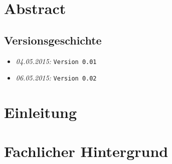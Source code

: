 \documentclass{fhnwreport/fhnwreport}
\begin{document}



\section*{Abstract}
\label{sec:abstract}



\clearpage




\tableofcontents

\vspace{80mm}
\subsection*{Versionsgeschichte}
\begin{itemize}
    \item[]
        \emph{04.05.2015:} \texttt{Version 0.01}
    \item[]
        \emph{06.05.2015:} \texttt{Version 0.02}
\end{itemize}
\clearpage



\clearpage
\section{Einleitung}
\label{sec:einleitung}



\clearpage
\section{Fachlicher Hintergrund}
\label{sec:fachlicher_hintergrund}

\end{document}
